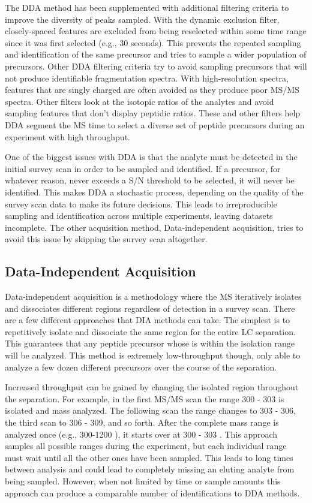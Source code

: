 The DDA method has been supplemented with additional filtering criteria to improve the diversity of \mz{} peaks sampled. With the dynamic exclusion filter, closely-spaced \mz{} features are excluded from being reselected within some time range since it was first selected (e.g., 30 seconds). This prevents the repeated sampling and identification of the same precursor and tries to sample a wider population of precursors. Other DDA filtering criteria try to avoid sampling precursors that will not produce identifiable fragmentation spectra. With high-resolution spectra, \mz{} features that are singly charged are often avoided as they produce poor MS/MS spectra. Other filters look at the isotopic ratios of the analytes and avoid sampling features that don't display peptidic ratios. These and other filters help DDA segment the MS time to select a diverse set of peptide precursors during an experiment with high throughput.

One of the biggest issues with DDA is that the analyte must be detected in the initial survey scan in order to be sampled and identified. If a precursor, for whatever reason, never exceeds a S/N threshold to be selected, it will never be identified. This makes DDA a stochastic process, depending on the quality of the survey scan data to make its future decisions. This leads to irreproducible sampling and identification across multiple experiments, leaving datasets incomplete. The other acquisition method, Data-independent acquisition, tries to avoid this issue by skipping the survey scan altogether.

\subsection*{Data-Independent Acquisition}
Data-independent acquisition is a methodology where the MS iteratively isolates and dissociates different \mz{} regions regardless of detection in a survey scan. There are a few different approaches that DIA methods can take. The simplest is to repetitively isolate and dissociate the same \mz{} region for the entire LC separation. This guarantees that any peptide precursor whose \mz{} is within the isolation range will be analyzed. This method is extremely low-throughput though, only able to analyze a few dozen different precursors over the course of the separation.

Increased throughput can be gained by changing the isolated \mz{} region throughout the separation. For example, in the first MS/MS scan the \mz{} range 300 - 303 is isolated and mass analyzed. The following scan the \mz{} range changes to 303 - 306, the third scan to 306 - 309, and so forth. After the complete mass range is analyzed once (e.g., 300-1200 \mz{}), it starts over at 300 - 303 \mz{}. This approach samples all possible \mz{} ranges during the experiment, but each individual \mz{} range must wait until all the other ones have been sampled. This leads to long times between analysis and could lead to completely missing an eluting analyte from being sampled. However, when not limited by time or sample amounts this approach can produce a comparable number of identifications to DDA methods.\cite{panda} 

